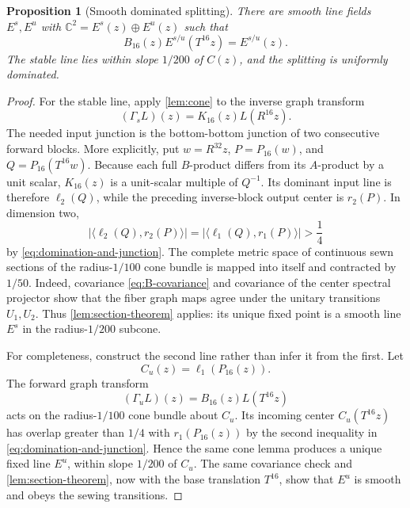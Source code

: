 \documentclass[10pt,a4paper]{amsart}
\numberwithin{equation}{section}
\newtheorem{proposition}[theorem]{Proposition}
\newcommand{\C}{\mathbb C}
\newcommand{\ip}[2]{\langle #1,#2\rangle}
\begin{document}
\begin{proposition}[Smooth dominated splitting]\label{prop:splitting}
There are smooth line fields $E^s,E^u$ with
$\C^2=E^s(z)\oplus E^u(z)$ such that
\begin{equation}\label{eq:N-invariance}
 B_{16}(z)E^{s/u}(T^{16}z)=E^{s/u}(z).
\end{equation}
The stable line lies within slope $1/200$ of $C(z)$, and the splitting is
uniformly dominated.
\end{proposition}

\begin{proof}
For the stable line, apply \cref{lem:cone} to the inverse graph transform
\[
 (\Gamma_s L)(z)=K_{16}(z)L(R^{16}z).
\]
The needed input junction is the bottom-bottom junction of two consecutive
forward blocks.  More explicitly, put $w=R^{32}z$,
$P=P_{16}(w)$, and $Q=P_{16}(T^{16}w)$.  Because each full $B$-product
differs from its $A$-product by a unit scalar, $K_{16}(z)$ is a unit-scalar
multiple of $Q^{-1}$.  Its dominant input line is therefore $\ell_2(Q)$,
while the preceding inverse-block output center is $r_2(P)$.  In dimension
two,
\[
 |\ip{\ell_2(Q)}{r_2(P)}|
 =|\ip{\ell_1(Q)}{r_1(P)}|>\frac14
\]
by \eqref{eq:domination-and-junction}.  The complete metric space of
continuous sewn sections of the radius-$1/100$ cone bundle is mapped into
itself and contracted by $1/50$.  Indeed, covariance
\eqref{eq:B-covariance} and covariance of the center spectral projector show
that the fiber graph maps agree under the unitary transitions $U_1,U_2$.
Thus \cref{lem:section-theorem} applies: its unique fixed point is a smooth
line $E^s$ in the radius-$1/200$ subcone.

For completeness, construct the second line rather than infer it from the
first.  Let
\[
 C_u(z)=\ell_1(P_{16}(z)).
\]
The forward graph transform
\[
 (\Gamma_u L)(z)=B_{16}(z)L(T^{16}z)
\]
acts on the radius-$1/100$ cone bundle about $C_u$.  Its incoming center
$C_u(T^{16}z)$ has overlap greater than $1/4$ with
$r_1(P_{16}(z))$ by the second inequality in
\eqref{eq:domination-and-junction}.  Hence the same cone lemma produces a
unique fixed line $E^u$, within slope $1/200$ of $C_u$.  The same covariance
check and \cref{lem:section-theorem}, now with the base translation $T^{16}$,
show that $E^u$ is smooth and obeys the sewing transitions.


\end{proof}
\end{document}
